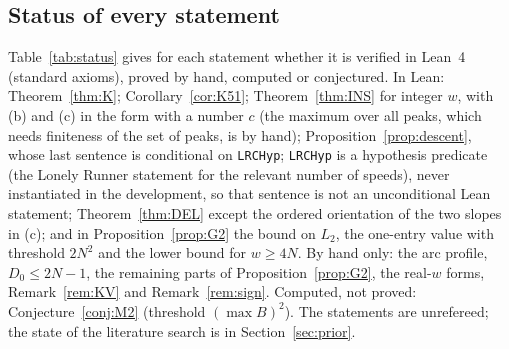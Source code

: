 \documentclass[11pt]{article}
\theoremstyle{definition}
\theoremstyle{remark}
\begin{document}
\subsection{Status of every statement}
Table~\ref{tab:status} gives for each statement whether it is verified in Lean~4 (standard axioms), proved by hand, computed or conjectured. In Lean: Theorem~\ref{thm:K}; Corollary~\ref{cor:K51}; Theorem~\ref{thm:INS} for integer $w$, with (b) and (c) in the form with a number $c$ (the maximum over all peaks, which needs finiteness of the set of peaks, is by hand); Proposition~\ref{prop:descent}, whose last sentence is conditional on \texttt{LRCHyp}; \texttt{LRCHyp} is a hypothesis predicate (the Lonely Runner statement for the relevant number of speeds), never instantiated in the development, so that sentence is not an unconditional Lean statement; Theorem~\ref{thm:DEL} except the ordered orientation of the two slopes in (c); and in Proposition~\ref{prop:G2} the bound on $L_2$, the one-entry value with threshold $2N^2$ and the lower bound for $w\ge4N$. By hand only: the arc profile, $D_0\le2N-1$, the remaining parts of Proposition~\ref{prop:G2}, the real-$w$ forms, Remark~\ref{rem:KV} and Remark~\ref{rem:sign}. Computed, not proved: Conjecture~\ref{conj:M2} (threshold $(\max B)^2$). The statements are unrefereed; the state of the literature search is in Section~\ref{sec:prior}.
\end{document}
